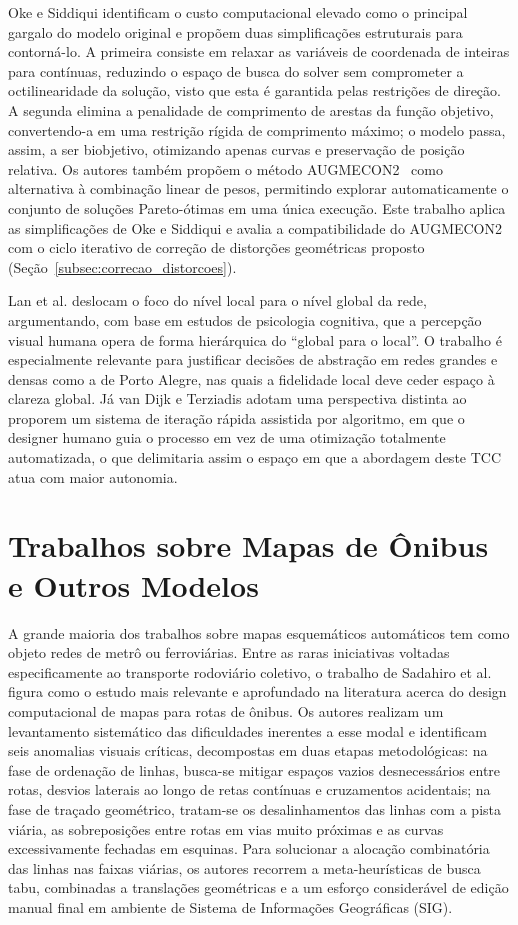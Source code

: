 \documentclass[cic,tc]{infufrgs}
\begin{document}
Oke e Siddiqui \cite{Oke} identificam o custo computacional elevado como o principal gargalo do modelo original e propõem duas simplificações estruturais para contorná-lo. A primeira consiste em relaxar as variáveis de coordenada de inteiras para contínuas, reduzindo o espaço de busca do solver sem comprometer a octilinearidade da solução, visto que esta é garantida pelas restrições de direção. A segunda elimina a penalidade de comprimento de arestas da função objetivo, convertendo-a em uma restrição rígida de comprimento máximo; o modelo passa, assim, a ser biobjetivo, otimizando apenas curvas e preservação de posição relativa. Os autores também propõem o método AUGMECON2~\cite{MAVROTAS20139652} como alternativa à combinação linear de pesos, permitindo explorar automaticamente o conjunto de soluções Pareto-ótimas em uma única execução. Este trabalho aplica as simplificações de Oke e Siddiqui e avalia a compatibilidade do AUGMECON2 com o ciclo iterativo de correção de distorções geométricas proposto (Seção~\ref{subsec:correcao_distorcoes}).

Lan et al. \cite{TianLan} deslocam o foco do nível local para o nível global da rede, argumentando, com base em estudos de psicologia cognitiva, que a percepção visual humana opera de forma hierárquica do ``global para o local''. O trabalho é especialmente relevante para justificar decisões de abstração em redes grandes e densas como a de Porto Alegre, nas quais a fidelidade local deve ceder espaço à clareza global. Já van Dijk e Terziadis \cite{ThomasC} adotam uma perspectiva distinta ao proporem um sistema de iteração rápida assistida por algoritmo, em que o designer humano guia o processo em vez de uma otimização totalmente automatizada, o que delimitaria assim o espaço em que a abordagem deste TCC atua com maior autonomia.

\section{Trabalhos sobre Mapas de Ônibus e Outros Modelos}

A grande maioria dos trabalhos sobre mapas esquemáticos automáticos tem como objeto redes de metrô ou ferroviárias. Entre as raras iniciativas voltadas especificamente ao transporte rodoviário coletivo, o trabalho de Sadahiro et al. \cite{Sadahiro2016} figura como o estudo mais relevante e aprofundado na literatura acerca do design computacional de mapas para rotas de ônibus. Os autores realizam um levantamento sistemático das dificuldades inerentes a esse modal e identificam seis anomalias visuais críticas, decompostas em duas etapas metodológicas: na fase de ordenação de linhas, busca-se mitigar espaços vazios desnecessários entre rotas, desvios laterais ao longo de retas contínuas e cruzamentos acidentais; na fase de traçado geométrico, tratam-se os desalinhamentos das linhas com a pista viária, as sobreposições entre rotas em vias muito próximas e as curvas excessivamente fechadas em esquinas. Para solucionar a alocação combinatória das linhas nas faixas viárias, os autores recorrem a meta-heurísticas de busca tabu, combinadas a translações geométricas e a um esforço considerável de edição manual final em ambiente de Sistema de Informações Geográficas (SIG).
\end{document}
